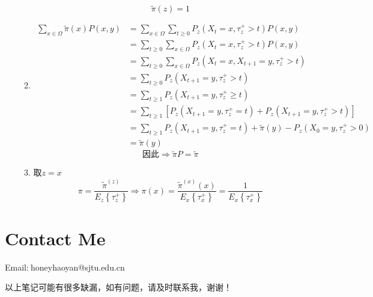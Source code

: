 \documentclass[a4paper, 11pt]{article} %
\begin{document}
\begin{small}
\begin{itemize}
\begin{enumerate}
$$    $$
    $$
     \widetilde{\pi}(z)=1
    $$
    \item
     \begin{align*}
    \sum _{x\in \Omega}\widetilde{\pi}(x)P(x,y)
     &=\sum_{x\in \Omega}\sum_{t\geq0}P_z(X_t=x,\tau_z^{+}>t)P(x,y)\\
     &=\sum_{t\geq0}\sum_{x\in \Omega}P_z(X_t=x,\tau_z^{+}>t)P(x,y)\\
     &=\sum_{t\geq0}\sum_{x\in \Omega}P_z(X_t=x,X_{t+1}=y,\tau_z^{+}>t)\\
     &=\sum_{t\geq0}P_z(X_{t+1}=y,\tau_z^{+}>t)\\
      &=\sum_{t\geq1}P_z(X_{t+1}=y,\tau_z^{+}\geq t)\\
      &=\sum_{t\geq1}[P_z(X_{t+1}=y,\tau_z^{+}=t)+P_z(X_{t+1}=y,\tau_z^{+}>t)]\\
      &=\sum_{t\geq1}P_z(X_{t+1}=y,\tau_z^{+}= t)+\widetilde{\pi}(y)-P_z(X_{0}=y,\tau_z^{+}>0)\\
      &=\widetilde{\pi}(y)
     \end{align*}
     $$
     \mbox{因此}\Longrightarrow \widetilde{\pi}P=\widetilde{\pi}
     $$
     \item
     取$z=x$
     $$
     \pi = \frac{\widetilde{\pi}^{(z)}}{E_z\left\{\tau_z^{+}\right\}}\Longrightarrow \pi(x) = \frac{\widetilde{\pi}^{(x)}(x)}{E_x\left\{\tau_x^{+}\right\}}=\frac{1}{E_x\left\{\tau_x^{+}\right\}}
     $$
 \end{enumerate}
\end{itemize}


\section{Contact Me}
Email:$\  $honeyhaoyan@sjtu.edu.cn

以上笔记可能有很多缺漏，如有问题，请及时联系我，谢谢！

\end{small}

%

%

\end{document}
